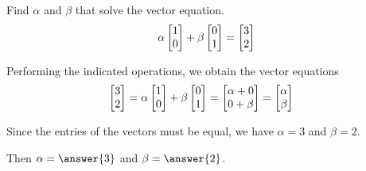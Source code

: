 \documentclass{ximera}
\author{Chris Black}
\begin{document}
\begin{exercise}
  Find $\alpha$ and $\beta$ that solve the vector equation.
  \[
    \alpha\begin{bmatrix}1\\0\end{bmatrix}+
    \beta\begin{bmatrix}0\\1\end{bmatrix}
    =
    \begin{bmatrix}3\\2\end{bmatrix}
  \]
  
  \begin{hint}
    Performing the indicated operations, we obtain the vector equations
    \begin{align*}
      \begin{bmatrix}3\\2\end{bmatrix}
   &=\alpha\begin{bmatrix}1\\0\end{bmatrix} + \beta\begin{bmatrix}0\\1\end{bmatrix}
      =\begin{bmatrix}\alpha + 0 \\ 0 + \beta\end{bmatrix}
      =\begin{bmatrix}\alpha\\ \beta\end{bmatrix}
    \end{align*}
  \end{hint}
  
  \begin{hint}
    Since the entries of the vectors must be equal, we have $\alpha = 3$ and $\beta = 2$.
  \end{hint}

  Then $\alpha = \answer{3}$ and $\beta = \answer{2}$.

\end{exercise}
\end{document}
